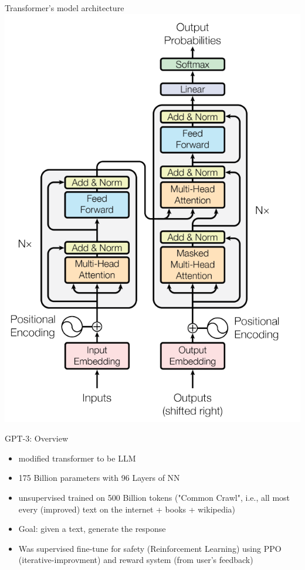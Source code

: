 \documentclass{beamer}
\begin{document}
\begin{frame}{Transformer's model architecture}
    \includegraphics[scale=0.35]
{img/trans_arch.png}
\centering
\end{frame}

\begin{frame}{GPT-3: Overview}
\begin{itemize}
    \item modified transformer to be LLM
    \item 175 Billion parameters with 96 Layers of NN
    \item unsupervised trained on 500 Billion tokens ("Common Crawl", i.e., all most every (improved) text on the internet + books + wikipedia)
    \item Goal: given a text, generate the response
    \item Was supervised fine-tune for safety (Reinforcement Learning) using PPO (iterative-improvment) and reward system (from user's feedback)
\end{itemize}

\end{frame}
\end{document}
